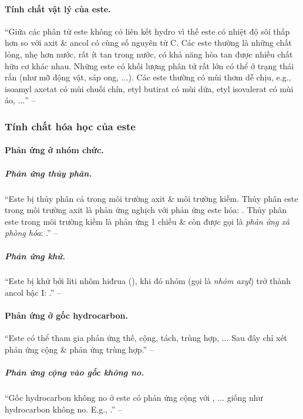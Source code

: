 \documentclass{article}
\numberwithin{equation}{section}
\begin{document}
\paragraph{Tính chất vật lý của este.} ``Giữa các phân tử este không có liên kết hydro vì thế este có nhiệt độ sôi thấp hơn so với axit \& ancol có cùng số nguyên tử C. Các este thường là những chất lỏng, nhẹ hơn nước, rất ít tan trong nước, có khả năng hòa tan được nhiều chất hữu cơ khác nhau. Những este có khối lượng phân tử rất lớn có thể ở trạng thái rắn (như mỡ động vật, sáp ong, $\ldots$). Các este thường có mùi thơm dễ chịu, e.g., isoamyl axetat có mùi chuối chín, etyl butirat có mùi dứa, etyl isovalerat có mùi áo, $\ldots$'' -- \cite[pp. 4--5]{SGK_Hoa_Hoc_12_nang_cao}

\subsubsection{Tính chất hóa học của este}

\paragraph{Phản ứng ở nhóm chức.}

\subparagraph{Phản ứng thủy phân.} ``Este bị thủy phân cả trong môi trường axit \& môi trường kiềm. Thủy phân este trong môi trường axit là phản ứng nghịch với phản ứng este hóa: . Thủy phân este trong môi trường kiềm là phản ứng 1 chiều \& còn được gọi là \textit{phản ứng xà phòng hóa}: .'' -- \cite[pp. 5]{SGK_Hoa_Hoc_12_nang_cao}

\subparagraph{Phản ứng khử.} ``Este bị khử bởi liti nhôm hiđrua (), khi đó nhóm  (gọi là \textit{nhóm axyl}) trở thành ancol bậc I: .'' -- \cite[pp. 5]{SGK_Hoa_Hoc_12_nang_cao}

\paragraph{Phản ứng ở gốc hydrocarbon.} ``Este có thể tham gia phản ứng thế, cộng, tách, trùng hợp, $\ldots$ Sau đây chỉ xét phản ứng cộng \& phản ứng trùng hợp.'' -- \cite[pp. 5]{SGK_Hoa_Hoc_12_nang_cao}

\subparagraph{Phản ứng cộng vào gốc không no.} ``Gốc hydrocarbon không no ở este có phản ứng cộng với , $\ldots$ giống như hydrocarbon không no. E.g., .'' -- \cite[pp. 5]{SGK_Hoa_Hoc_12_nang_cao}
\end{document}
